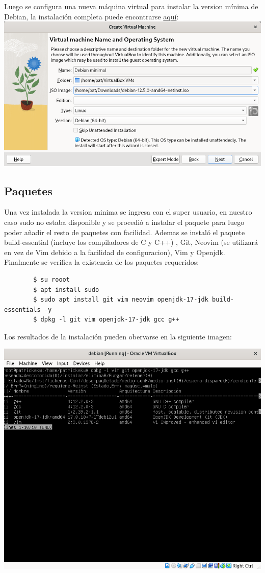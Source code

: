 \documentclass{article}
\begin{document}
        Luego se configura una nueva máquina virtual para instalar la version mínima de Debian, la instalación completa puede encontrarse \href{https://youtu.be/oMSiG6R_-X8}{aquí}: \\ 
    
    \includegraphics[scale=0.5]{capturas_debian/VM-init.png}

    \subsection{Paquetes}
        Una vez instalada la version minima se ingresa con el super usuario, en nuestro caso sudo no estaba disponible y se procedió a instalar el paquete para luego poder añadir el resto de paquetes con facilidad. Ademas se instaló el paquete build-essential (incluye los compiladores de C y C++) , Git, Neovim (se utilizará en vez de Vim debido a la facilidad de configuracion), Vim y Openjdk. Finalmente se verifica la existencia de los paquetes requeridos:
        \begin{verbatim}
        $ su rooot
        $ apt install sudo
        $ sudo apt install git vim neovim openjdk-17-jdk build-essentials -y
        $ dpkg -l git vim openjdk-17-jdk gcc g++
        \end{verbatim}

        Los resultados de la instalación pueden obervarse en la siguiente imagen:
        
        \includegraphics[scale=0.5,trim={0 15cm 0 0},clip]{capturas_debian/Paquetes.png}  
\end{document}
